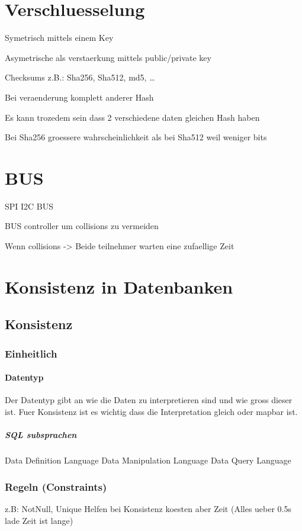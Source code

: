 \usepackage{lisitings}
\section{Verschluesselung}

Symetrisch mittels einem Key

Asymetrische als verstaerkung mittels public/private key

Checksums z.B.: Sha256, Sha512, md5, \ldots

Bei veraenderung komplett anderer Hash

Es kann trozedem sein dass 2 verschiedene daten gleichen Hash haben

Bei Sha256 groessere wahrscheinlichkeit als bei Sha512 weil weniger bits

\section{BUS}

SPI I2C BUS 

BUS controller um collisions zu vermeiden

Wenn collisions -> Beide teilnehmer warten eine zufaellige Zeit

\section{Konsistenz in Datenbanken}
\subsection{Konsistenz}
\subsubsection{Einheitlich}
\paragraph{Datentyp}
Der Datentyp gibt an wie die Daten zu interpretieren sind und wie gross dieser ist.
Fuer Konsistenz ist es wichtig dass die Interpretation gleich oder mapbar ist.

\subparagraph{SQL subsprachen}
Data Definition Language
Data Manipulation Language
Data Query Language

\subsubsection{Regeln (Constraints)}
z.B: NotNull, Unique
Helfen bei Konsistenz koesten aber Zeit (Alles ueber 0.5s lade Zeit ist lange)


